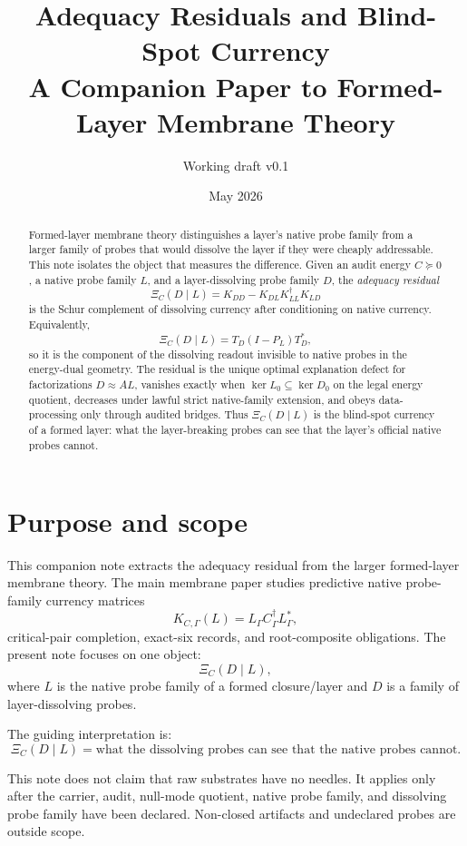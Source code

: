 \documentclass[11pt]{article}
\title{Adequacy Residuals and Blind-Spot Currency\\
\large A Companion Paper to Formed-Layer Membrane Theory}
\author{Working draft v0.1}
\date{May 2026}
\begin{document}
\maketitle

\begin{abstract}
Formed-layer membrane theory distinguishes a layer's native probe family from a larger family of probes that would dissolve the layer if they were cheaply addressable.  This note isolates the object that measures the difference.  Given an audit energy $C\succeq 0$, a native probe family $L$, and a layer-dissolving probe family $D$, the \emph{adequacy residual}
\[
\Xi_C(D\mid L)=K_{DD}-K_{DL}K_{LL}^{\dagger}K_{LD}
\]
is the Schur complement of dissolving currency after conditioning on native currency.  Equivalently,
\[
\Xi_C(D\mid L)=T_D(I-P_L)T_D^*,
\]
so it is the component of the dissolving readout invisible to native probes in the energy-dual geometry.  The residual is the unique optimal explanation defect for factorizations $D\approx AL$, vanishes exactly when $\ker L_0\subseteq \ker D_0$ on the legal energy quotient, decreases under lawful strict native-family extension, and obeys data-processing only through audited bridges.  Thus $\Xi_C(D\mid L)$ is the blind-spot currency of a formed layer: what the layer-breaking probes can see that the layer's official native probes cannot.
\end{abstract}

\section{Purpose and scope}

This companion note extracts the adequacy residual from the larger formed-layer membrane theory.  The main membrane paper studies predictive native probe-family currency matrices
\[
K_{C,\Gamma}(L)=L_\Gamma C_\Gamma^\dagger L_\Gamma^*,
\]
critical-pair completion, exact-six records, and root-composite obligations.  The present note focuses on one object:
\[
\Xi_C(D\mid L),
\]
where $L$ is the native probe family of a formed closure/layer and $D$ is a family of layer-dissolving probes.

The guiding interpretation is:
\[
\boxed{\Xi_C(D\mid L)=\text{what the dissolving probes can see that the native probes cannot.}}
\]

This note does not claim that raw substrates have no needles.  It applies only after the carrier, audit, null-mode quotient, native probe family, and dissolving probe family have been declared.  Non-closed artifacts and undeclared probes are outside scope.
\end{document}
